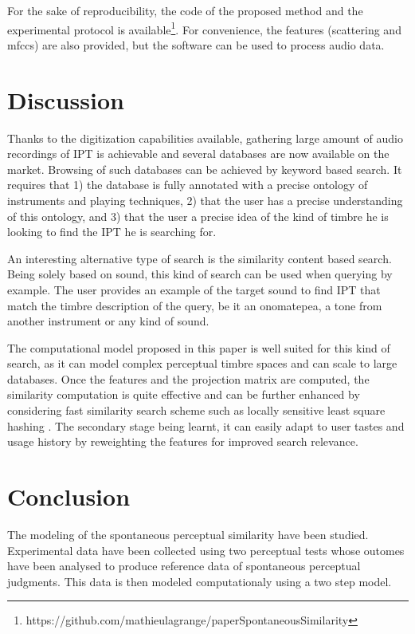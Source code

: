 \documentclass{article}
\newcommand{\ipt}{IPT\xspace}
\begin{document}
For the sake of reproducibility, the code of the proposed method and the experimental protocol is available\footnote{https://github.com/mathieulagrange/paperSpontaneousSimilarity}. For convenience, the features (scattering and mfccs) are also provided, but the software can be used to process audio data.

\section{Discussion}\label{sec:discussion}

Thanks to the digitization capabilities available, gathering large amount of audio recordings of \ipt is achievable and several databases are now available on the market. Browsing of such databases can be achieved by keyword based search. It requires that 1) the database is fully annotated with a precise ontology of instruments and playing techniques, 2) that the user has a precise understanding of this ontology, and 3) that the user a precise idea of the kind of timbre he is looking to find the \ipt he is searching for.

An interesting alternative type of search is the similarity content based search. Being solely based on sound, this kind of search can be used when querying by example. The user provides an example of the target sound to find \ipt that match the timbre description of the query, be it an onomatepea, a tone from another instrument or any kind of sound.

The computational model proposed in this paper is well suited for this kind of search, as it can model complex perceptual timbre spaces and can scale to large databases. Once the features and the projection matrix are computed, the similarity computation is quite effective and can be further enhanced by considering fast similarity search scheme such as locally sensitive least square hashing \cite{pauleve2010locality}. The secondary stage being learnt, it can easily adapt to user tastes and usage history by reweighting the features for improved search relevance.

\section{Conclusion}

The modeling of the spontaneous perceptual similarity have been studied. Experimental data have been collected using two perceptual tests whose outomes have been analysed to produce reference data of spontaneous perceptual judgments. This data is then modeled computationaly using a two step model.
\end{document}
